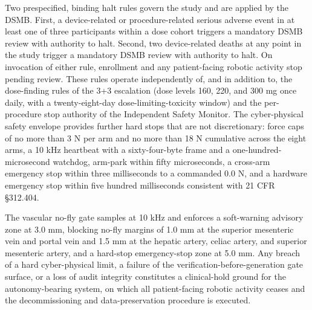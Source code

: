 Two prespecified, binding halt rules govern the study and are applied by the DSMB.
First, a device-related or procedure-related serious adverse event in at least one
of three participants within a dose cohort triggers a mandatory DSMB review with
authority to halt. Second, two device-related deaths at any point in the study
trigger a mandatory DSMB review with authority to halt. On invocation of either
rule, enrollment and any patient-facing robotic activity stop pending review. These
rules operate independently of, and in addition to, the dose-finding rules of the
3+3 escalation (dose levels 160, 220, and 300 mg once daily, with a twenty-eight-day
dose-limiting-toxicity window) and the per-procedure stop authority of the
Independent Safety Monitor. The cyber-physical safety envelope provides further
hard stops that are not discretionary: force caps of no more than 3 N per arm and no
more than 18 N cumulative across the eight arms, a 10 kHz heartbeat with a
sixty-four-byte frame and a one-hundred-microsecond watchdog, arm-park within fifty
microseconds, a cross-arm emergency stop within three milliseconds to a commanded
0.0 N, and a hardware emergency stop within five hundred milliseconds consistent
with 21 CFR \S 312.404. 

The vascular no-fly gate samples at 10 kHz and enforces a
soft-warning advisory zone at 3.0 mm, blocking no-fly margins of 1.0 mm at the
superior mesenteric vein and portal vein and 1.5 mm at the hepatic artery, celiac
artery, and superior mesenteric artery, and a hard-stop emergency-stop zone at 5.0
mm. Any breach of a hard cyber-physical limit, a failure of the
verification-before-generation gate surface, or a loss of audit integrity
constitutes a clinical-hold ground for the autonomy-bearing system, on which all
patient-facing robotic activity ceases and the decommissioning and data-preservation
procedure is executed.

